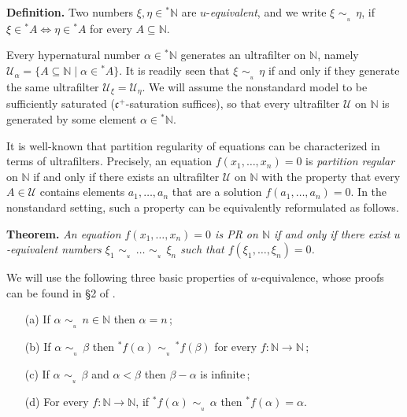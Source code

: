 \documentclass[11pt]{amsart}
\theoremstyle{definition}
\theoremstyle{remark}
\numberwithin{equation}{section}
\begin{document}
\smallskip
\noindent
\textbf{Definition.}
Two numbers $\xi,\eta\in{{{}^*{\mathbb{N}}}}$ are $u$-\emph{equivalent},
and we write $\xi\,{{\,{\sim}_{{}_{\!\!\!\!\! u}}\;}}\,\eta$, 
if $\xi\in{{}^*A}\Leftrightarrow \eta\in{{}^*A}$ for every $A\subseteq{\mathbb{N}}$.

\smallskip
Every hypernatural number $\alpha\in{{{}^*{\mathbb{N}}}}$ generates
an ultrafilter on ${\mathbb{N}}$, namely ${\mathcal{U}}_\alpha=\{A\subseteq{\mathbb{N}}\mid \alpha\in{{}^*A}\}$.
It is readily seen that $\xi\,{{\,{\sim}_{{}_{\!\!\!\!\! u}}\;}}\,\eta$ if and only if they
generate the same ultrafilter ${\mathcal{U}}_\xi={\mathcal{U}}_\eta$.
We will assume the nonstandard model to be sufficiently saturated
($\mathfrak{c}^+$-saturation suffices),
so that every ultrafilter ${\mathcal{U}}$ on ${\mathbb{N}}$ is generated
by some element $\alpha\in{{{}^*{\mathbb{N}}}}$.

It is well-known that partition regularity of equations can be characterized
in terms of ultrafilters. Precisely,
an equation $f(x_1,\ldots,x_n)=0$
is \emph{partition regular} on ${\mathbb{N}}$ if and only if
there exists an ultrafilter ${\mathcal{U}}$ on ${\mathbb{N}}$ with the 
property that every $A\in{\mathcal{U}}$ contains elements $a_1,\ldots,a_n$
that are a solution $f(a_1,\ldots,a_n)=0$.
In the nonstandard setting, such a property can be
equivalently reformulated as follows.

\smallskip
\noindent
\textbf{Theorem.}
\emph{An equation $f(x_1,\ldots,x_n)=0$ is PR on ${\mathbb{N}}$ if
and only if there exist $u$-equivalent numbers 
$\xi_1\,{{\,{\sim}_{{}_{\!\!\!\!\! u}}\;}}\,\ldots\,{{\,{\sim}_{{}_{\!\!\!\!\! u}}\;}}\,\xi_n$ such that $f(\xi_1,\ldots,\xi_n)=0$.}

\smallskip
We will use the following three basic properties of $u$-equivalence,
whose proofs can be found in \S 2 of \cite{DN15}.

\begin{enumerate}
\item[(a)]
If $\alpha\,{{\,{\sim}_{{}_{\!\!\!\!\! u}}\;}}\,n\in{\mathbb{N}}$ then $\alpha=n$\,;

\smallskip
\item[(b)]
If $\alpha\,{{\,{\sim}_{{}_{\!\!\!\!\! u}}\;}}\,\beta$ then ${{}^*f}(\alpha)\,{{\,{\sim}_{{}_{\!\!\!\!\! u}}\;}}\,{{}^*f}(\beta)$
for every $f:{\mathbb{N}}\to{\mathbb{N}}$\,;

\smallskip
\item[(c)]
If $\alpha\,{{\,{\sim}_{{}_{\!\!\!\!\! u}}\;}}\,\beta$ and $\alpha<\beta$ then $\beta-\alpha$ is infinite\,;

\smallskip
\item[(d)]
For every $f:{\mathbb{N}}\to{\mathbb{N}}$, if ${{}^*f}(\alpha)\,{{\,{\sim}_{{}_{\!\!\!\!\! u}}\;}}\,\alpha$ then ${{}^*f}(\alpha)=\alpha$.
\end{enumerate}
\end{document}
